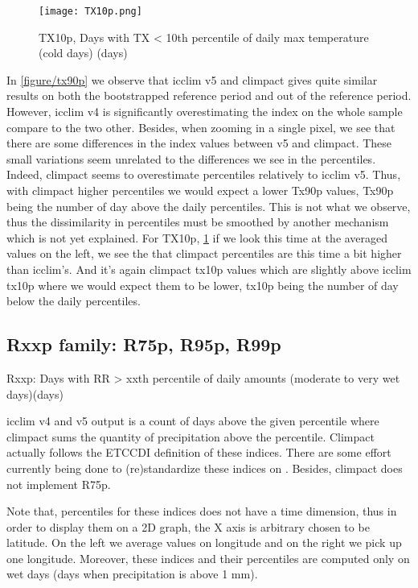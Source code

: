 \documentclass[a4paper,11pt]{article}
\begin{document}
        \begin{figure}[!hbt]
            \centering
            \texttt{[image: TX10p.png]}
            \caption{TX10p, Days with TX < 10th percentile of daily max temperature (cold days) (days)}
            \label{figure/tx10p}
        \end{figure}

        In \ref{figure/tx90p} we observe that icclim v5 and climpact gives quite similar results on both the bootstrapped reference period and out of the reference period.
        However, icclim v4 is significantly overestimating the index on the whole sample compare to the two other.
        Besides, when zooming in a single pixel, we see that there are some differences in the index values between v5 and climpact.
        These small variations seem unrelated to the differences we see in the percentiles.
        Indeed, climpact seems to overestimate percentiles relatively to icclim v5. Thus, with climpact higher percentiles we would expect a lower Tx90p values, Tx90p being the number of day above the daily percentiles.
        This is not what we observe, thus the dissimilarity in percentiles must be smoothed by another mechanism which is not yet explained.
        For TX10p, \ref{figure/tx10p} if we look this time at the averaged values on the left, we see the that climpact percentiles are this time a bit higher than icclim's.
        And it's again climpact tx10p values which are slightly above icclim tx10p where we would expect them to be lower, tx10p being the number of day below the daily percentiles.
        

    \subsection{Rxxp family: R75p, R95p, R99p}
        Rxxp: Days with RR > xxth percentile of daily amounts (moderate to very wet days)(days)

        icclim v4 and v5 output is a count of days above the given percentile where climpact sums the quantity of precipitation above the percentile. 
        Climpact actually follows the ETCCDI\cite{doc/etccdi} definition of these indices.
        There are some effort currently being done to (re)standardize these indices on \cite{gh/clixmeta}.
        Besides, climpact does not implement R75p.

        Note that, percentiles for these indices does not have a time dimension, thus in order to display them on a 2D graph, the X axis is arbitrary chosen to be latitude.
        On the left we average values on longitude and on the right we pick up one longitude.
        Moreover, these indices and their percentiles are computed only on wet days (days when precipitation is above 1 mm).
\end{document}
